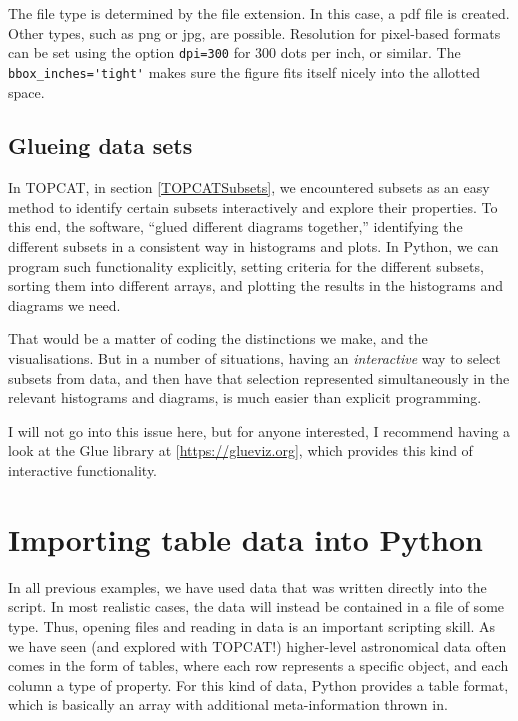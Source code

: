 \documentclass[twocolumn,apj]{openjournal}
\begin{document}
The file type is determined by the file extension. In this case, a pdf file is created. Other types, such as png or jpg, are possible. Resolution for pixel-based formats can be set using the option \verb|dpi=300| for 300 dots per inch, or similar. The \verb|bbox_inches='tight'| makes sure the figure fits itself nicely into the allotted space.

\subsection{Glueing data sets}
\label{Sec:Glue}

In TOPCAT, in section \ref{TOPCATSubsets}, we encountered subsets as an easy method to identify certain subsets interactively and explore their properties. To this end, the software, ``glued different diagrams together,'' identifying the different subsets in a consistent way in histograms and plots. In Python, we can program such functionality explicitly, setting criteria for the different subsets, sorting them into different arrays, and plotting the results in the histograms and diagrams we need. 

That would be a matter of coding the distinctions we make, and the visualisations. But in a number of situations, having an {\em interactive} way to select subsets from data, and then have that selection represented simultaneously in the relevant histograms and diagrams, is much easier than explicit programming. 

I will not go into this issue here, but for anyone interested, I recommend having a look at the Glue library at [\href{https://glueviz.org}{https://glueviz.org}], which provides this kind of interactive functionality.

\section{Importing table data into Python}

In all previous examples, we have used data that was written directly into the script. In most realistic cases, the data will instead be contained in a file of some type. Thus, opening files and reading in data is an important scripting skill. As we have seen (and explored with TOPCAT!) higher-level astronomical data often comes in the form of tables, where each row represents a specific object, and each column a type of property. For this kind of data, Python provides a table format, which is basically an array with additional meta-information thrown in.
\end{document}
